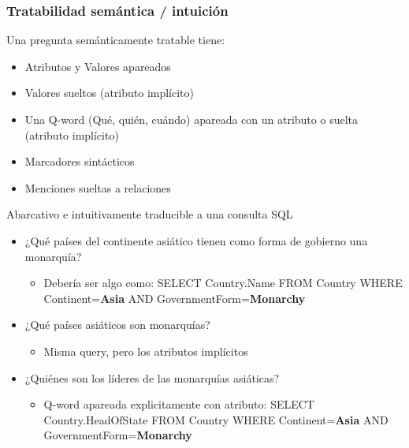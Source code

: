 \fontsize{7.0pt}{6.0}\selectfont
\begin{frame}[<+->]
  \frametitle{Tratabilidad semántica / intuición}
    \begin{block}{Una pregunta semánticamente tratable tiene:}
      \begin{itemize}
          \item {\color{blue}Atributos} y {\color{blue}Valores} apareados
          \item {\color{red}Valores} sueltos (atributo implícito)
          \item Una {\color{green}Q-word} (Qué, quién, cuándo) apareada con un atributo o suelta (atributo implícito)
          \item Marcadores sintácticos
          \item {\color{orange}Menciones sueltas a relaciones}
      \end{itemize}
    \end{block}
    \begin{exampleblock}{Abarcativo e intuitivamente traducible a una consulta SQL}
      \begin{itemize}
          \item ¿{\color{green}Qué} {\color{orange}países} del {\color{blue}continente} {\color{blue}asiático} tienen como {\color{blue}forma} de {\color{blue}gobierno} una {\color{blue}monarquía}?
            \begin{itemize}
              \item \fontsize{6pt}{5}\selectfont Debería ser algo como: {\color{purple}SELECT} Country.Name {\color{purple}FROM} Country {\color{purple}WHERE} Continent=\textbf{Asia} {\color{purple}AND} GovernmentForm=\textbf{Monarchy}
            \end{itemize}
            \item ¿{\color{green}Qué} {\color{orange}países} {\color{red}asiáticos} son {\color{red}monarquías}?
            \begin{itemize}
              \item \fontsize{6pt}{5}\selectfont Misma query, pero los atributos implícitos
            \end{itemize}
            \item ¿{\color{green}Quiénes} son los {\color{green}líderes} de las {\color{red}monarquías} {\color{red}asiáticas}?
            \begin{itemize}
              \item  \fontsize{6pt}{5}\selectfont Q-word apareada explicitamente con atributo: {\color{purple}SELECT} Country.HeadOfState {\color{purple}FROM} Country {\color{purple}WHERE} Continent=\textbf{Asia} {\color{purple}AND} GovernmentForm=\textbf{Monarchy}
            \end{itemize}
      \end{itemize}
    \end{exampleblock}
    
\end{frame}

